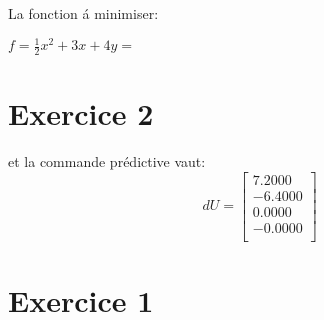 \documentclass[twoside,twocolumn]{article}
\begin{document}
La fonction á minimiser:

$f = \frac{1}{2}x^2+3x+4y =$
\label{matlab}


\section{Exercice 2}
\label{matlab}

et la commande prédictive vaut:
\[dU =\begin{bmatrix}
    7.2000\\
   -6.4000\\
    0.0000\\
   -0.0000\\
\end{bmatrix}
\]
\section{Exercice 1}
\label{matlab}

\end{document}
